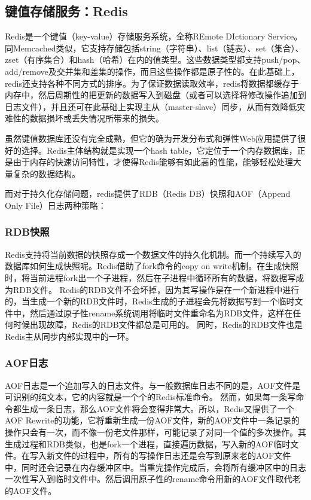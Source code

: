 \documentclass{article}
\begin{document}
\begin{CJK}{UTF8}{gbsn}
	\subsection{键值存储服务：Redis}
  Redis\cite{N07}是一个键值（key-value）存储服务系统，全称REmote DIctionary Service。同Memcached类似，它支持存储包括string（字符串）、list（链表）、set（集合）、zset（有序集合）和hash（哈希）在内的值类型。这些数据类型都支持push/pop、add/remove及交并集和差集的操作，而且这些操作都是原子性的。在此基础上，redis还支持各种不同方式的排序。为了保证数据读取效率，redis将数据都缓存于内存中，然后周期性的把更新的数据写入到磁盘（或者可以选择将修改操作追加到日志文件），并且还可在此基础上实现主从（master-slave）同步，从而有效降低灾难性的数据损坏或丢失情况所带来的损失。

  虽然键值数据库还没有完全成熟，但它的确为开发分布式和弹性Web应用提供了很好的选择\cite{N06}。Redis主体结构就是实现一个hash table，它定位于一个内存数据库，正是由于内存的快速访问特性，才使得Redis能够有如此高的性能，能够轻松处理大量复杂的数据结构。

  而对于持久化存储问题，redis提供了RDB（Redis DB）快照和AOF（Append Only File）日志两种策略：

	\subsubsection{RDB快照}
	Redis支持将当前数据的快照存成一个数据文件的持久化机制。而一个持续写入的数据库如何生成快照呢。Redis借助了fork命令的copy on write机制。在生成快照时，将当前进程fork出一个子进程，然后在子进程中循环所有的数据，将数据写成为RDB文件。
  Redis的RDB文件不会坏掉，因为其写操作是在一个新进程中进行的，当生成一个新的RDB文件时，Redis生成的子进程会先将数据写到一个临时文件中，然后通过原子性rename系统调用将临时文件重命名为RDB文件，这样在任何时候出现故障，Redis的RDB文件都总是可用的。
  同时，Redis的RDB文件也是Redis主从同步内部实现中的一环。
	\subsubsection{AOF日志}
	AOF日志是一个追加写入的日志文件。与一般数据库日志不同的是，AOF文件是可识别的纯文本，它的内容就是一个个的Redis标准命令。
  然而，如果每一条写命令都生成一条日志，那么AOF文件将会变得非常大。所以，Redis又提供了一个AOF Rewrite的功能，它将重新生成一份AOF文件，新的AOF文件中一条记录的操作只会有一次，而不像一份老文件那样，可能记录了对同一个值的多次操作。其生成过程和RDB类似，也是fork一个进程，直接遍历数据，写入新的AOF临时文件。在写入新文件的过程中，所有的写操作日志还是会写到原来老的AOF文件中，同时还会记录在内存缓冲区中。当重完操作完成后，会将所有缓冲区中的日志一次性写入到临时文件中。然后调用原子性的rename命令用新的AOF文件取代老的AOF文件。


\end{CJK}
\end{document}
